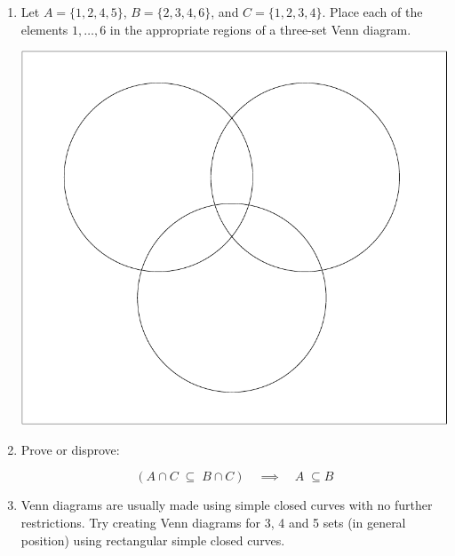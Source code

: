 \begin{enumerate}
\item Let $A = \{1,2,4,5\}$, $B=\{2,3,4,6\}$, and $C=\{1,2,3,4\}$.  Place each of the elements $1, \ldots , 6$ in the appropriate regions of a three-set Venn diagram.

\centerline{\includegraphics[scale=.75]{figures/3set_Venn}}


\item Prove or disprove:

\[ ( A \cap C \; \subseteq \; B \cap C ) \quad \implies \quad A \; \subseteq B \]


\newpage

\item  Venn diagrams are usually made using simple closed curves 
with no further restrictions.  Try creating Venn diagrams for 3, 4 and
5 sets (in general position) using rectangular simple closed curves.


\wbvfill

\workbookpagebreak


\end{enumerate}
